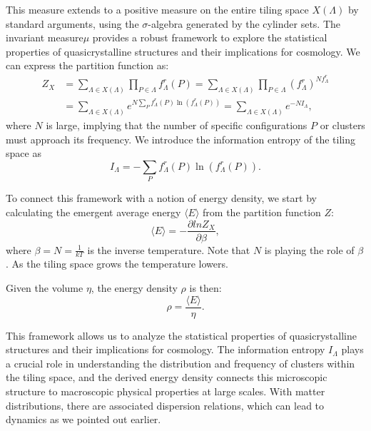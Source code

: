 \documentclass{article}
\begin{document}
This measure extends to a positive measure on the entire tiling space $X(\varLambda)$ by standard arguments, using the \(\sigma\)-algebra generated by the cylinder sets.  
The invariant measure$\mu$ provides a robust framework to explore the statistical properties of quasicrystalline structures and their implications for cosmology. We can express the partition function as: 
\begin{align}
Z_{X} & =\sum_{\varLambda\in X(\varLambda)}\prod_{P\in\varLambda}f_{\varLambda}^{r}(P)=\sum_{\varLambda\in X(\varLambda)}\prod_{P\in\varLambda}\left(f_{\varLambda}^{r}\right)^{Nf_{\varLambda}^{r}}\nonumber \\
 & =\sum_{\varLambda\in X(\varLambda)}e^{N\sum_{P}f_{\varLambda}^{r}(P)\ln(f_{\varLambda}^{r}(P))}=\sum_{\varLambda\in X(\varLambda)}e^{-NI_{\varLambda}},
\end{align}
where $N$ is large, implying that the number of specific configurations
$P$ or clusters must approach its frequency. We introduce the information
entropy of the tiling space as 
\begin{equation}
I_{\varLambda}=-\sum_{P}f_{\varLambda}^{r}(P)\ln(f_{\varLambda}^{r}(P)).
\end{equation}

To connect this framework with a notion of energy density, we start
by calculating the emergent average energy $\langle E\rangle$ from
the partition function $Z$: 
\begin{equation}
\langle E\rangle=-\frac{\partial lnZ_{X}}{\partial\beta},
\end{equation}
where $\beta=N=\frac{1}{kT}$ is the inverse temperature. Note that
$N$ is playing the role of $\beta$. As the tiling space grows the
temperature lowers.

Given the volume $\eta$, the energy density $\rho$ is then: 
\begin{equation}
\rho=\frac{\langle E\rangle}{\eta}.
\end{equation}

This framework allows us to analyze the statistical properties of quasicrystalline structures and their implications for cosmology. The information entropy $I_{\varLambda}$ plays a crucial role in understanding the distribution and frequency of clusters within the tiling space, and the derived energy density connects this microscopic structure to macroscopic physical properties at large scales. With matter distributions, there are associated dispersion relations, which can lead to dynamics as we pointed out earlier.
\end{document}
